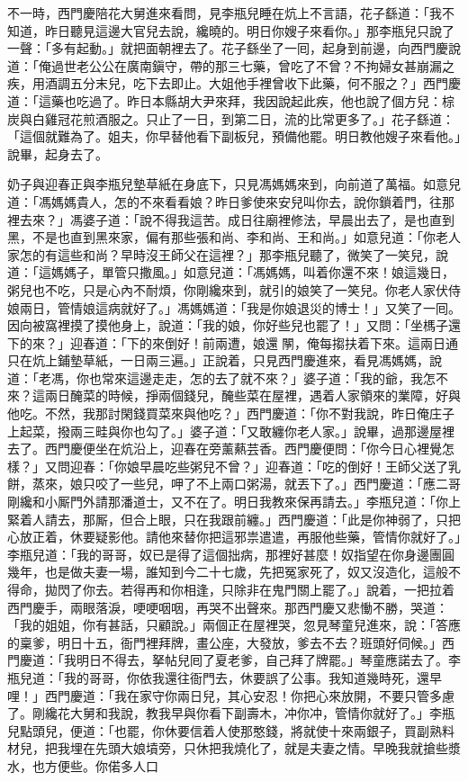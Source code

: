 不一時，西門慶陪花大舅進來看問，見李瓶兒睡在炕上不言語，花子繇道：「我不知道，昨日聽見這邊大官兒去說，纔曉的。明日你嫂子來看你。」那李瓶兒只說了一聲：「多有起動。」{}就把面朝裡去了。花子繇坐了一囘，起身到前邊，向西門慶說道：「俺過世老公公在廣南鎭守，帶的那三七藥，曾吃了不曾？不拘婦女甚崩漏之疾，用酒調五分末兒，吃下去即止。大姐他手裡曾收下此藥，何不服之？」西門慶道：「這藥也吃過了。昨日本縣胡大尹來拜，我因說起此疾，他也說了個方兒：棕炭與白雞冠花煎酒服之。只止了一日，到第二日，流的比常更多了。」花子繇道：「這個就難為了。姐夫，你早替他看下副板兒，預備他罷。明日教他嫂子來看他。」說畢，起身去了。

奶子與迎春正與李瓶兒墊草紙在身底下，只見馮媽媽來到，向前道了萬福。如意兒道：「馮媽媽貴人，怎的不來看看娘？昨日爹使來安兒叫你去，說你鎖着門，往那裡去來？」馮婆子道：「說不得我這苦。成日往廟裡修法，早晨出去了，是也直到黑，不是也直到黑來家，偏有那些張和尚、李和尚、王和尚。」{}如意兒道：「你老人家怎的有這些和尚？早時沒王師父在這裡？」那李瓶兒聽了，微笑了一笑兒，說道：「這媽媽子，單管只撒風。」如意兒道：「馮媽媽，叫着你還不來！娘這幾日，粥兒也不吃，只是心內不耐煩，你剛纔來到，就引的娘笑了一笑兒。你老人家伏侍娘兩日，管情娘這病就好了。」馮媽媽道：「我是你娘退災的博士！」又笑了一囘。因向被窩裡摸了摸他身上，說道：「我的娘，你好些兒也罷了！」又問：「坐榪子還下的來？」迎春道：「下的來倒好！前兩遭，娘還𨴃䦛，俺每搊扶着下來。這兩日通只在炕上鋪墊草紙，一日兩三遍。」正說着，只見西門慶進來，看見馮媽媽，說道：「老馮，你也常來這邊走走，怎的去了就不來？」婆子道：「我的爺，我怎不來？這兩日醃菜的時候，掙兩個錢兒，醃些菜在屋裡，遇着人家領來的業障，好與他吃。不然，我那討閑錢買菜來與他吃？」{}西門慶道：「你不對我說，昨日俺庄子上起菜，撥兩三畦與你也勾了。」婆子道：「又敢纏你老人家。」說畢，過那邊屋裡去了。西門慶便坐在炕沿上，迎春在旁薰爇芸香。西門慶便問：「你今日心裡覺怎樣？」又問迎春：「你娘早晨吃些粥兒不曾？」迎春道：「吃的倒好！王師父送了乳餅，蒸來，娘只咬了一些兒，呷了不上兩口粥湯，就丟下了。」西門慶道：「應二哥剛纔和小厮門外請那潘道士，又不在了。明日我教來保再請去。」李瓶兒道：「你上緊着人請去，那厮，但合上眼，只在我跟前纏。」西門慶道：「此是你神弱了，只把心放正着，休要疑影他。請他來替你把這邪祟遣遣，再服他些藥，管情你就好了。」李瓶兒道：「我的哥哥，奴已是得了這個拙病，那裡好甚麼！奴指望在你身邊團圓幾年，也是做夫妻一場，誰知到今二十七歲，先把冤家死了，奴又沒造化，這般不得命，拋閃了你去。若得再和你相逢，只除非在鬼門關上罷了。」說着，一把拉着西門慶手，兩眼落淚，哽哽咽咽，再哭不出聲來。那西門慶又悲慟不勝，哭道：「我的姐姐，你有甚話，只顧說。」兩個正在屋裡哭，忽見琴童兒進來，說：「答應的稟爹，明日十五，衙門裡拜牌，畫公座，大發放，爹去不去？班頭好伺候。」西門慶道：「我明日不得去，拏帖兒囘了夏老爹，自己拜了牌罷。」琴童應諾去了。李瓶兒道：「我的哥哥，你依我還往衙門去，休要誤了公事。我知道幾時死，還早哩！」西門慶道：「我在家守你兩日兒，其心安忍！你把心來放開，不要只管多慮了。剛纔花大舅和我說，教我早與你看下副壽木，冲你冲，管情你就好了。」李瓶兒點頭兒，便道：「也罷，你休要信着人使那憨錢，將就使十來兩銀子，買副熟料材兒，把我埋在先頭大娘墳旁，只休把我燒化了，就是夫妻之情。早晚我就搶些漿水，也方便些。你偌多人口